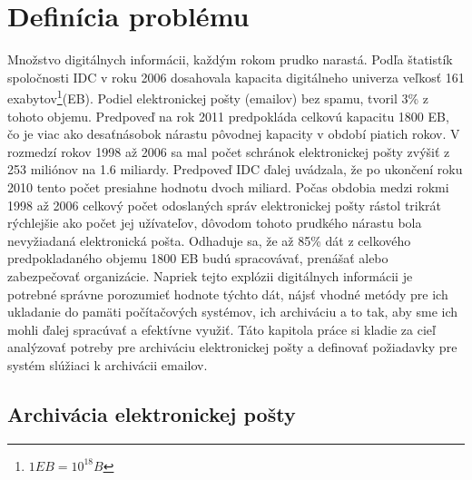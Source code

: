 \documentclass[11pt,twoside,a4paper]{book}
\begin{document}
\chapter{Definícia problému}

Množstvo digitálnych informácii, každým rokom prudko narastá. Podľa štatistík spoločnosti IDC\cite{Gantz_Mcarthur_Minton_2007} v roku 2006 dosahovala kapacita digitálneho univerza veľkosť 161 exabytov\footnote{$1 EB = 10^{18}B$}(EB). Podiel elektronickej pošty (emailov) bez spamu, tvoril 3\% z tohoto objemu. Predpoveď na rok 2011\cite{Gantz_Chute_Manfrediz_Minton_Reinsel_Schlichting_Toncheva_2008} predpokláda celkovú kapacitu 1800 EB, čo je viac ako desaťnásobok nárastu pôvodnej kapacity v období piatich rokov. V rozmedzí rokov 1998 až 2006 sa mal počet schránok elektronickej pošty zvýšiť z 253 miliónov na 1.6 miliardy. Predpoveď IDC ďalej uvádzala, že po ukončení roku 2010 tento počet presiahne hodnotu dvoch miliard. Počas obdobia medzi rokmi 1998 až 2006 celkový počet odoslaných správ elektronickej pošty rástol trikrát rýchlejšie ako počet jej užívateľov, dôvodom tohoto prudkého nárastu bola nevyžiadaná elektronická pošta. Odhaduje sa, že až 85\% dát z celkového predpokladaného objemu 1800 EB budú spracovávať, prenášať alebo zabezpečovať organizácie. Napriek tejto explózii digitálnych informácii je potrebné správne porozumieť hodnote týchto dát, nájsť vhodné metódy pre ich ukladanie do pamäti počítačových systémov, ich archiváciu a to tak, aby sme ich mohli ďalej spracúvať a efektívne využiť. Táto kapitola práce si kladie za cieľ analýzovať potreby pre archiváciu elektronickej pošty a definovať požiadavky pre systém slúžiaci k archivácii emailov.


\section{Archivácia elektronickej pošty}
\end{document}
